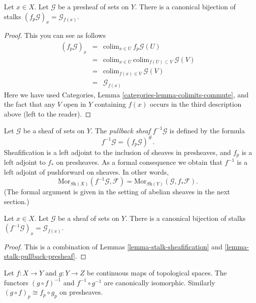 \begin{lemma}
\label{lemma-stalk-pullback-presheaf}
Let $x \in X$. Let $\mathcal{G}$ be a presheaf of sets on $Y$.
There is a canonical bijection of stalks
$(f_p\mathcal{G})_x = \mathcal{G}_{f(x)}$.
\end{lemma}

\begin{proof}
This you can see as follows
\begin{eqnarray*}
(f_p\mathcal{G})_x
& = &
\text{colim}_{x \in U}\ f_p\mathcal{G}(U) \\
& = &
\text{colim}_{x \in U}\ \text{colim}_{f(U) \subset V}\ \mathcal{G}(V) \\
& = &
\text{colim}_{f(x) \in V}\ \mathcal{G}(V) \\
& = &
\mathcal{G}_{f(x)}
\end{eqnarray*}
Here we have used
Categories, Lemma \ref{categories-lemma-colimits-commute},
and the fact that any $V$ open in $Y$ containing $f(x)$
occurs in the third description above (left to the reader).
\end{proof}

\noindent
Let $\mathcal{G}$ be a sheaf of sets on $Y$.
The {\it pullback sheaf} $f^{-1}\mathcal{G}$ is defined
by the formula
$$
f^{-1}\mathcal{G} = (f_p\mathcal{G})^\# .
$$
Sheafification is a left adjoint to the inclusion
of sheaves in presheaves, and $f_p$ is a left
adjoint to $f_*$ on presheaves. As a formal consequence
we obtain that $f^{-1}$ is a left adjoint of
pushforward on sheaves. In other words,
$$
\text{Mor}_{\textit{Sh}(X)}(f^{-1}\mathcal{G}, \mathcal{F})
=
\text{Mor}_{\textit{Sh}(Y)}(\mathcal{G}, f_*\mathcal{F}).
$$
(The formal argument is given in the setting of abelian
sheaves in the next section.)

\begin{lemma}
\label{lemma-stalk-pullback}
Let $x \in X$. Let $\mathcal{G}$ be a sheaf of sets on $Y$.
There is a canonical bijection of stalks
$(f^{-1}\mathcal{G})_x = \mathcal{G}_{f(x)}$.
\end{lemma}

\begin{proof}
This is a combination of Lemmas \ref{lemma-stalk-sheafification}
and \ref{lemma-stalk-pullback-presheaf}.
\end{proof}

\begin{lemma}
\label{lemma-pullback-composition}
Let $f : X \to Y$ and $g : Y \to Z$ be continuous maps
of topological spaces. The functors $(g \circ f)^{-1}$
and $f^{-1} \circ g^{-1}$ are canonically isomorphic.
Similarly $(g \circ f)_p \cong f_p \circ g_p$ on
presheaves.
\end{lemma}

